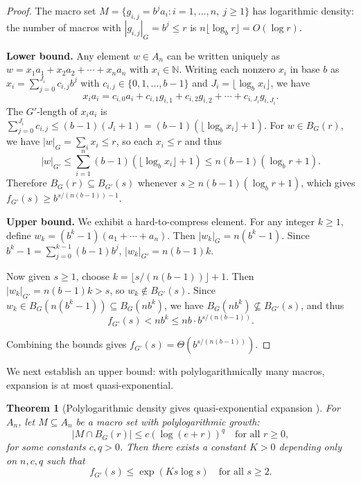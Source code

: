 \documentclass[12pt]{amsart}
\newcommand{\N}{\mathbb{N}}
\newtheorem{theorem}{Theorem}
\theoremstyle{definition}
\theoremstyle{remark}
\begin{document}
\begin{proof}
The macro set $M = \{ g_{i,j} = b^j a_i : i = 1, \ldots, n, \ j \geq 1 \}$ has logarithmic density: the number of macros with $|g_{i,j}|_G = b^j \leq r$ is $n \lfloor \log_b r \rfloor = O(\log r)$.

\textbf{Lower bound.}
Any element $w \in A_n$ can be written uniquely as $w = x_1 a_1 + x_2 a_2 + \cdots + x_n a_n$ with $x_i \in \N$.
Writing each nonzero $x_i$ in base $b$ as $x_i = \sum_{j=0}^{J_i} c_{i,j} b^j$ with $c_{i,j} \in \{0, 1, \ldots, b-1\}$ and $J_i = \lfloor \log_b x_i \rfloor$, we have
\[
x_i a_i = c_{i,0} a_i + c_{i,1} g_{i,1} + c_{i,2} g_{i,2} + \cdots + c_{i,J_i} g_{i,J_i}.
\]
The $G'$-length of $x_i a_i$ is $\sum_{j=0}^{J_i} c_{i,j} \leq (b-1)(J_i + 1) = (b-1)(\lfloor \log_b x_i \rfloor + 1)$.
For $w \in B_G(r)$, we have $|w|_G = \sum_i x_i \leq r$, so each $x_i \leq r$ and thus
\[
|w|_{G'} \leq \sum_{i=1}^n (b-1)(\lfloor \log_b x_i \rfloor + 1) \leq n(b-1)(\log_b r + 1).
\]
Therefore $B_G(r) \subseteq B_{G'}(s)$ whenever $s \geq n(b-1)(\log_b r + 1)$, which gives $f_{G'}(s) \geq b^{s/(n(b-1)) - 1}$.

\textbf{Upper bound.}
We exhibit a hard-to-compress element.
For any integer $k \geq 1$, define $w_k = (b^k - 1)(a_1 + \cdots + a_n)$.
Then $|w_k|_G = n(b^k - 1)$.
Since $b^k - 1 = \sum_{j=0}^{k-1}(b-1)b^j$, $|w_k|_{G'} = n(b-1)k$.

Now given $s \geq 1$, choose $k = \lfloor s/(n(b-1)) \rfloor + 1$.
Then $|w_k|_{G'} = n(b-1)k > s$, so $w_k \notin B_{G'}(s)$.
Since $w_k \in B_G(n(b^k - 1)) \subseteq B_G(nb^k)$, we have $B_G(nb^k) \not\subseteq B_{G'}(s)$, and thus
\[
f_{G'}(s) < nb^k \leq nb \cdot b^{s/(n(b-1))}.
\]

Combining the bounds gives $f_{G'}(s) = \Theta(b^{s/(n(b-1))})$.
\end{proof}

We next establish an upper bound: with polylogarithmically many macros, 
expansion is at most quasi-exponential.

\begin{theorem}[Polylogarithmic density gives quasi-exponential expansion ]\label{thm:abelian-upper}
For $A_n$, let $M \subseteq A_n$ be a macro set with polylogarithmic growth:
\[
|M \cap B_G(r)| \leq c(\log(e + r))^q \quad \text{for all } r \geq 0,
\]
for some constants $c, q > 0$.
Then there exists a constant $K > 0$ depending only on $n, c, q$ such that
\[
f_{G'}(s) \leq \exp(K s \log s) \quad \text{for all } s \geq 2.
\]
\end{theorem}
\end{document}
